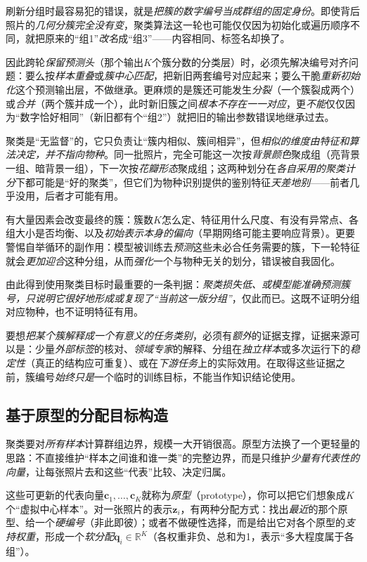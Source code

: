 刷新分组时最容易犯的错误，就是\emph{把簇的数字编号当成群组的固定身份}。即使背后照片的\emph{几何分簇完全没有变}，聚类算法这一轮也可能仅仅因为初始化或遍历顺序不同，就把原来的“组1”\emph{改名}成“组3”——内容相同、标签名却换了。

因此跨轮\emph{保留预测头}（那个输出$K$个簇分数的分类层）时，必须先解决编号对齐问题：要么按\emph{样本重叠}或\emph{簇中心匹配}，把新旧两套编号对应起来；要么干脆\emph{重新初始化}这个预测输出层，不做继承。更麻烦的是簇还可能发生\emph{分裂}（一个簇裂成两个）或\emph{合并}（两个簇并成一个），此时新旧簇之间\emph{根本不存在一一对应}，更\emph{不能}仅仅因为“数字恰好相同”（新旧都有个“组2”）就把旧的输出参数错误地继承过去。

聚类是“无监督”的，它只负责让“簇内相似、簇间相异”，但\emph{相似的维度由特征和算法决定，并不指向物种}。同一批照片，完全可能这一次按\emph{背景颜色}聚成组（亮背景一组、暗背景一组），下一次按\emph{花瓣形态}聚成组；这两种划分在\emph{各自采用的聚类计分}下都可能是“好的聚类”，但它们为物种识别提供的鉴别特征\emph{天差地别}——前者几乎没用，后者才可能有用。

有大量因素会改变最终的簇：簇数$K$怎么定、特征用什么尺度、有没有异常点、各组大小是否均衡、以及\emph{初始表示本身的偏向}（早期网络可能主要响应背景）。更要警惕自举循环的副作用：模型被训练去\emph{预测}这些未必合任务需要的簇，下一轮特征就会\emph{更加迎合}这种分组，从而\emph{强化}一个与物种无关的划分，错误被自我固化。

由此得到使用聚类目标时最重要的一条判据：\emph{聚类损失低、或模型能准确预测簇号，只说明它很好地形成或复现了“当前这一版分组”}，仅此而已。这既不证明分组对应物种，也不证明特征有用。

要想\emph{把某个簇解释成一个有意义的任务类别}，必须有\emph{额外}的证据支撑，证据来源可以是：少量\emph{外部标签}的核对、\emph{领域专家}的解释、分组在\emph{独立样本}或多次运行下的\emph{稳定性}（真正的结构应可重复）、或在\emph{下游任务}上的实际效用。在取得这些证据之前，簇编号\emph{始终只是}一个临时的训练目标，不能当作知识结论使用。

\subsection{基于原型的分配目标构造}
\label{sec:data-derived-knowledge-prototype-targets}

聚类要对\emph{所有样本}计算群组边界，规模一大开销很高。原型方法换了一个更轻量的思路：不直接维护“样本之间谁和谁一类”的完整边界，而是只维护\emph{少量有代表性的向量}，让每张照片去和这些“代表”比较、决定归属。

这些可更新的代表向量$\bm{c}_1,\ldots,\bm{c}_K$就称为\emph{原型}（prototype），你可以把它们想象成$K$个“虚拟中心样本”。对一张照片的表示$\bm{z}_i$，有两种分配方式：找出\emph{最近}的那个原型、给一个\emph{硬编号}（非此即彼）；或者不做硬性选择，而是给出它对各个原型的\emph{支持权重}，形成一个\emph{软分配}$\bm{q}_i\in\mathbb{R}^{K}$（各权重非负、总和为1，表示“多大程度属于各组”）。

